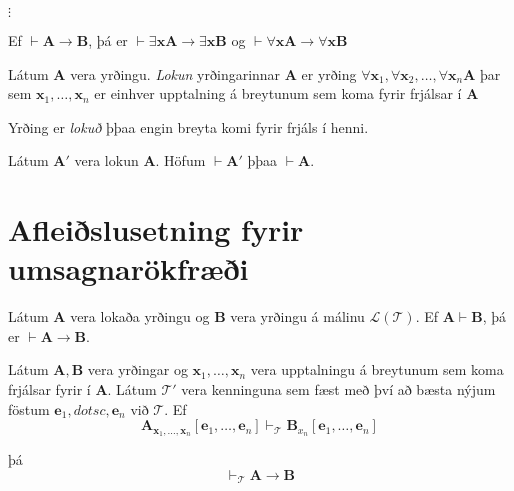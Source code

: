 \documentclass[12pt]{article}
\begin{document}
$\vdots$



\begin{setn}[Fylgisetning]
  Ef $\vdash \mathbf{A} \rightarrow \mathbf{B}$, þá er
  $ \vdash \exists \mathbf{x} \mathbf{A} \rightarrow   \exists \mathbf{x} \mathbf{B}$
  og $\vdash \forall \mathbf{x}\mathbf{A} \rightarrow \forall \mathbf{x} \mathbf{B}$
\end{setn}


\begin{skgr}
  Látum $\mathbf{A}$ vera yrðingu. \emph{Lokun} yrðingarinnar
  $\mathbf{A}$ er yrðing $\forall \mathbf{x}_1, \forall \mathbf{x}_2, \dotsc,
  \forall \mathbf{x}_n \mathbf{A}$ þar sem $\mathbf{x}_1, \dotsc, \mathbf{x}_n$
er einhver upptalning á breytunum sem koma fyrir frjálsar í $\mathbf{A}$
\end{skgr}

\begin{ath}
  Yrðing er \emph{lokuð} þþaa engin breyta komi fyrir frjáls í henni.
\end{ath}

\begin{setn}[Fylgisetn]
  Látum $\mathbf{A}'$ vera lokun $\mathbf{A}$. Höfum $\vdash \mathbf{A}'$
  þþaa $\vdash \mathbf{A}$.
\end{setn}

\section{Afleiðslusetning fyrir umsagnarökfræði}

Látum $\mathbf{A}$ vera lokaða yrðingu og $\mathbf{B}$ vera
yrðingu á málinu $\mathcal{L(T)}$.
Ef $\mathbf{A} \vdash \mathbf{B}$, þá er $\vdash \mathbf{A} \rightarrow \mathbf{B}$.



\begin{setn}[Fylgisetning]
  Látum $\mathbf{A}, \mathbf{B}$ vera yrðingar og $\mathbf{x}_1, \dotsc, \mathbf{x}_n$
vera upptalningu á breytunum sem koma frjálsar fyrir í $\mathbf{A}$. Látum $\mathcal{T}'$
vera  kenninguna sem fæst með því að bæsta nýjum föstum $\mathbf{e}_1, dotsc, \mathbf{e}_n$
við $\mathcal{T}$. Ef
\[
\mathbf{A}_{\mathbf{x}_1, \dotsc, \mathbf{x}_n}[\mathbf{e}_1, \dotsc, \mathbf{e}_n] \vdash_{\mathcal{T}}
\mathbf{B}_{x_n}[\mathbf{e}_1, \dotsc, \mathbf{e}_n]
\]

þá
\[ \vdash_{\mathcal{T}} \mathbf{A} \rightarrow \mathbf{B} \]



\end{setn}
\end{document}
